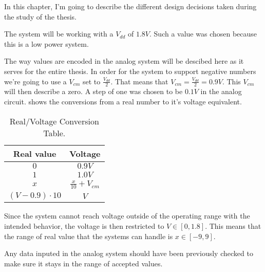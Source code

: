 
\label{cap:design}

In this chapter, I'm going to describe the different design decisions taken during the study of the thesis.

The system will be working with a $V_{dd}$ of $1.8V$. Such a value was chosen because this is a low power system.

The way values are encoded in the analog system will be descibed here as it serves for the entire thesis.
In order for the system to support negative numbers we're going to use a $V_{cm}$ set to $\frac{V_{dd}}{2}$. That means that $V_{cm}=\frac{V_{dd}}{2}=0.9V$. This $V_{cm}$ will then describe a zero. A step of one was chosen to be $0.1V$ in the analog circuit.
 shows the conversions from a real number to it's voltage equivalent.

\begin{table}[H]
  \centering
  \begin{tabular}{|c|c|}
    \hline
    \rowcolor{gray}
    Real value & Voltage \\
    \hline
    $0$ & $0.9V$ \\
    \hline
    $1$ & $1.0V$ \\
    \hline
    $x$ & $\frac{x}{10}+V_{cm}$\\
    \hline
    $(V-0.9)\cdot 10$ & $V$\\
    \hline
  \end{tabular}
  \caption{Real/Voltage Conversion Table.}
  \label{tab:valConv}
\end{table}

Since the system cannot reach voltage outside of the operating range with the intended behavior, the voltage is then restricted to $V\in [0,1.8]$. This means that the range of real value that the systems can handle is $x\in [-9,9]$.

Any data inputed in the analog system should have been previously checked to make sure it stays in the range of accepted values.











\cleardoublepage
